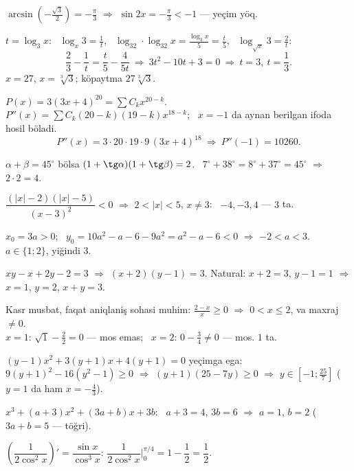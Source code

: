 $\arcsin\left(-\frac{\sqrt3}2\right)=-\frac\pi3$ $\Rightarrow$ $\sin2x=-\frac\pi3<-1$ — yeçim yöq.

$t=\log_3x$: \ $\log_x3=\frac1t$, \ $\log_32\cdot\log_{32}x=\frac{\log_3x}{5}=\frac t5$, \ $\log_{\sqrt x}3=\frac2t$:
\[\frac23-\frac1t=\frac t5-\frac4{5t}\ \Rightarrow\ 3t^2-10t+3=0\ \Rightarrow\ t=3,\ t=\frac13.\]
$x=27$, $x=\sqrt[3]3$; köpaytma $27\sqrt[3]3$.

$P(x)=3(3x+4)^{20}=\sum C_kx^{20-k}$. \ $P''(x)=\sum C_k(20-k)(19-k)x^{18-k}$; \ $x=-1$ da aynan berilgan ifoda hosil böladi.
\[P''(x)=3\cdot20\cdot19\cdot9\,(3x+4)^{18}\ \Rightarrow\ P''(-1)=10260.\]

$\alpha+\beta=45^\circ$ bölsa $(1+\tg\alpha)(1+\tg\beta)=2$. \ $7^\circ+38^\circ=8^\circ+37^\circ=45^\circ$ $\Rightarrow$ $2\cdot2=4$.

$\dfrac{(|x|-2)(|x|-5)}{(x-3)^2}<0$ $\Rightarrow$ $2<|x|<5$, $x\ne3$: \ $-4,-3,4$ — $3$ ta.

$x_0=3a>0$; \ $y_0=10a^2-a-6-9a^2=a^2-a-6<0$ $\Rightarrow$ $-2<a<3$. \ $a\in\{1;2\}$, yiğindi $3$.

$xy-x+2y-2=3$ $\Rightarrow$ $(x+2)(y-1)=3$. Natural: $x+2=3$, $y-1=1$ $\Rightarrow$ $x=1$, $y=2$, $x+y=3$.

Kasr musbat, faqat aniqlaniş sohasi muhim: $\frac{2-x}x\ge0$ $\Rightarrow$ $0<x\le2$, va maxraj $\ne0$.\\
$x=1$: $\sqrt1-\frac22=0$ — mos emas; \ $x=2$: $0-\frac34\ne0$ — mos. $1$ ta.

$(y-1)x^2+3(y+1)x+4(y+1)=0$ yeçimga ega: $9(y+1)^2-16(y^2-1)\ge0$ $\Rightarrow$ $(y+1)(25-7y)\ge0$ $\Rightarrow$ $y\in\left[-1;\frac{25}7\right]$ ($y=1$ da ham $x=-\frac43$).

$x^3+(a+3)x^2+(3a+b)x+3b$: \ $a+3=4$, $3b=6$ $\Rightarrow$ $a=1$, $b=2$ ($3a+b=5$ — töğri).

$\left(\dfrac1{2\cos^2x}\right)'=\dfrac{\sin x}{\cos^3x}$: \quad $\dfrac1{2\cos^2x}\Big|_0^{\pi/4}=1-\dfrac12=\dfrac12$.

